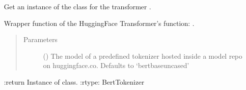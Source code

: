 \documentclass[letterpaper,10pt,english]{sphinxmanual}
\begin{document}
\begin{fulllineitems}
\label{\detokenize{code:code_utils.utils.get_bert_tokenizer}}
Get an instance of the class  for the transformer .

Wrapper function of the HuggingFace Transformer’s  function:
.
\begin{quote}\begin{description}
\item[{Parameters}] \leavevmode
{} (\sphinxstyleliteralemphasis{\sphinxupquote{, }}) \textendash{} The model  of a predefined tokenizer hosted inside a
model repo on huggingface.co. Defaults to ‘bert\sphinxhyphen{}base\sphinxhyphen{}uncased’

\end{description}\end{quote}

:return Instance of  class.
:rtype: BertTokenizer

\end{fulllineitems}

\end{document}
